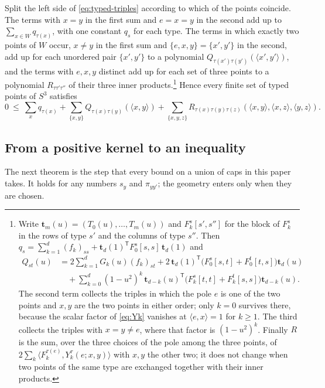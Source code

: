 \documentclass[11pt,reqno]{amsart}
\renewcommand{\_}{\origunderscore\allowbreak}
\numberwithin{equation}{section}
\theoremstyle{plain}
\theoremstyle{definition}
\theoremstyle{remark}
\begin{document}
Split the left side of \eqref{eq:typed-triples} according to which of the
points coincide. The terms with $x=y$ in the first sum and $e=x=y$ in the
second add up to $\sum_{x\in W}q_{\tau(x)}$, with one constant $q_s$ for
each type. The terms in which exactly two points of $W$ occur, $x\ne y$ in
the first sum and $\{e,x,y\}=\{x',y'\}$ in the second, add up for each
unordered pair $\{x',y'\}$ to a polynomial
$Q_{\tau(x')\tau(y')}(\langle x',y'\rangle)$, and the terms with $e,x,y$
distinct add up for each set of three points to a polynomial
$R_{\tau\tau'\tau''}$ of their three inner products.\footnote{Write
  $\mathbf t_m(u)=(T_0(u),\dots,T_m(u))$ and $F^s_k[s',s'']$ for the block
  of $F^s_k$ in the rows of type $s'$ and the columns of type $s''$. Then
  $q_s=\sum_{k=1}^d(f_k)_{ss}+\mathbf t_d(1)^{\mathsf T}F^s_0[s,s]\,\mathbf t_d(1)$ and
  \begin{align*}
  Q_{st}(u)&=\textstyle2\sum_{k=1}^dG_k(u)(f_k)_{st}
   +2\,\mathbf t_d(1)^{\mathsf T}\bigl(F^s_0[s,t]+F^t_0[t,s]\bigr)\mathbf t_d(u)\\
   &\quad\textstyle+\sum_{k=0}^d(1-u^2)^k\,\mathbf t_{d-k}(u)^{\mathsf T}\bigl(F^s_k[t,t]+F^t_k[s,s]\bigr)\mathbf t_{d-k}(u).
  \end{align*}
  The second term collects the triples in which the pole $e$ is one of the
  two points and $x,y$ are the two points in either order; only $k=0$
  survives there, because the scalar factor of \eqref{eq:Yk} vanishes at
  $\langle e,x\rangle=1$ for $k\ge1$. The third collects the triples with
  $x=y\ne e$, where that factor is $(1-u^2)^k$. Finally $R$ is the sum,
  over the three choices of the pole among the three points, of
  $2\sum_k\langle F^{\tau(e)}_k,Y^\tau_k(e;x,y)\rangle$ with $x,y$ the
  other two; it does not change when two points of the same type are
  exchanged together with their inner products.}
Hence every finite set of typed points of $S^3$ satisfies
\begin{equation}\label{eq:typed-split}
  0\ \le\ \sum_{x}q_{\tau(x)}+\sum_{\{x,y\}}Q_{\tau(x)\tau(y)}(\langle x,y\rangle)
  +\sum_{\{x,y,z\}}R_{\tau(x)\tau(y)\tau(z)}(\langle x,y\rangle,\langle x,z\rangle,\langle y,z\rangle).
\end{equation}

\subsection{From a positive kernel to an inequality}\label{sec:kernels-template}

The next theorem is the step that every bound on a union of caps in this
paper takes. It holds for any numbers $s_y$ and $\pi_{yy'}$; the geometry
enters only when they are chosen.
\end{document}
